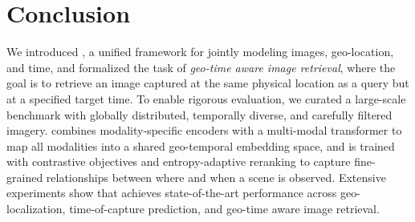 \section{Conclusion}

We introduced \tiger, a unified framework for jointly modeling images, geo-location, and time, and formalized the task of \emph{geo-time aware image retrieval}, where the goal is to retrieve an image captured at the same physical location as a query but at a specified target time. To enable rigorous evaluation, we curated a large-scale benchmark with globally distributed, temporally diverse, and carefully filtered imagery. \tiger combines modality-specific encoders with a multi-modal transformer to map all modalities into a shared geo-temporal embedding space, and is trained with contrastive objectives and entropy-adaptive reranking to capture fine-grained relationships between where and when a scene is observed. Extensive experiments show that \tiger achieves state-of-the-art performance across geo-localization, time-of-capture prediction, and geo-time aware image retrieval.






